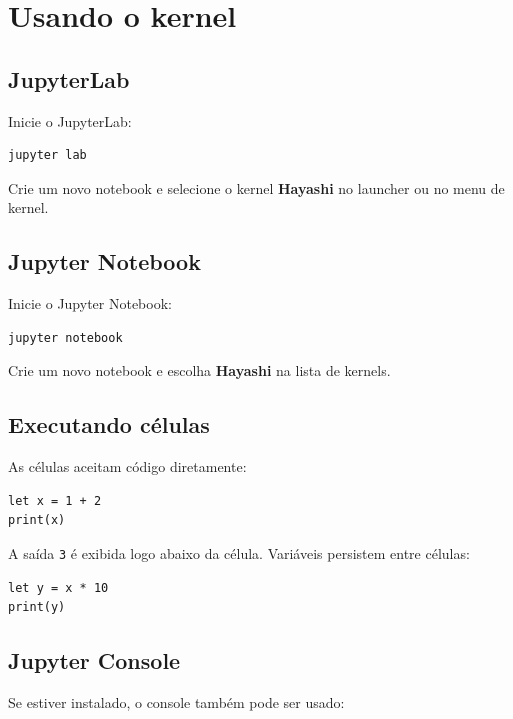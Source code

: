 \section{Usando o kernel}

\subsection{JupyterLab}

Inicie o JupyterLab:

\begin{lstlisting}[style=inline, language=sh]
jupyter lab
\end{lstlisting}

Crie um novo notebook e selecione o kernel \textbf{Hayashi} no launcher ou no menu
de kernel.

\subsection{Jupyter Notebook}

Inicie o Jupyter Notebook:

\begin{lstlisting}[style=inline, language=sh]
jupyter notebook
\end{lstlisting}

Crie um novo notebook e escolha \textbf{Hayashi} na lista de kernels.

\subsection{Executando células}

As células aceitam código \hayashi{} diretamente:

\begin{lstlisting}[caption={Exemplo de célula no Jupyter}]
let x = 1 + 2
print(x)
\end{lstlisting}

A saída \texttt{3} é exibida logo abaixo da célula. Variáveis persistem entre
células:

\begin{lstlisting}[caption={Célula posterior com a mesma sessão}]
let y = x * 10
print(y)
\end{lstlisting}

\subsection{Jupyter Console}

Se estiver instalado, o console também pode ser usado:


